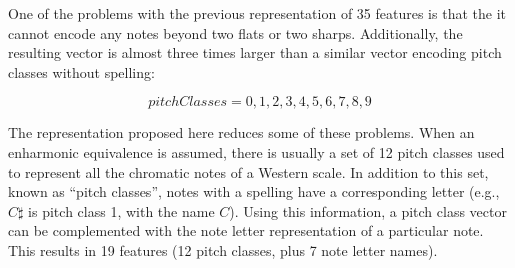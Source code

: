 
One of the problems with the previous representation of 35
features is that the it cannot encode any notes beyond two
flats or two sharps. Additionally, the resulting vector is
almost three times larger than a similar vector encoding
pitch classes without spelling:

\begin{equation}
    pitchClasses = {0, 1, 2, 3, 4, 5, 6, 7, 8, 9}
\end{equation}

The representation proposed here reduces some of these
problems. When an enharmonic equivalence is assumed, there
is usually a set of 12 pitch classes used to represent all
the chromatic notes of a Western scale. In addition to this
set, known as ``pitch classes'', notes with a spelling have
a corresponding letter (e.g., $C\sharp$ is pitch class 1,
with the name $C$). Using this information, a pitch class
vector can be complemented with the note letter
representation of a particular note. This results in 19
features (12 pitch classes, plus 7 note letter names).
